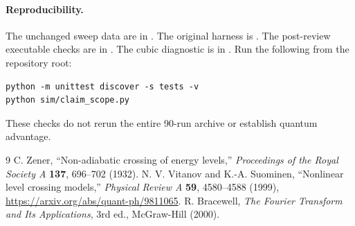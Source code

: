 \documentclass[11pt]{article}
\begin{document}
\paragraph{Reproducibility.}
The unchanged sweep data are in .
The original harness is .
The post-review executable checks are in .
The cubic diagnostic is in .
Run the following from the repository root:
\begin{verbatim}
python -m unittest discover -s tests -v
python sim/claim_scope.py
\end{verbatim}
These checks do not rerun the entire
90-run archive or establish quantum advantage.

\begin{thebibliography}{9}
 C. Zener, ``Non-adiabatic crossing of energy levels,''
\emph{Proceedings of the Royal Society A} \textbf{137}, 696--702 (1932).
 N. V. Vitanov and K.-A. Suominen,
``Nonlinear level crossing models,'' \emph{Physical Review A} \textbf{59},
4580--4588 (1999), \url{https://arxiv.org/abs/quant-ph/9811065}.
 R. Bracewell, \emph{The Fourier Transform and Its
Applications}, 3rd ed., McGraw-Hill (2000).
\end{thebibliography}
\end{document}
